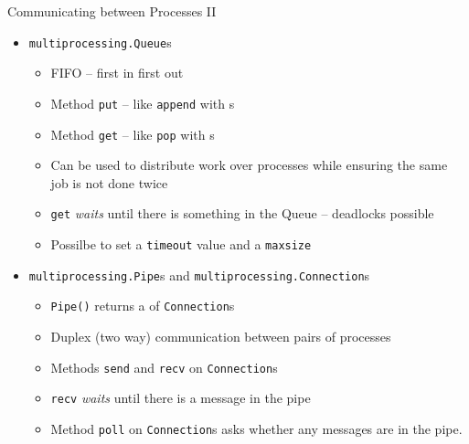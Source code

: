 \begin{frame}[fragile]{Communicating between Processes II}
%
\begin{itemize}
\item \texttt{multiprocessing.Queue}s
	\begin{itemize}
	\item FIFO -- first in first out
	\item Method \texttt{put} -- like \texttt{append} with s
	\item Method \texttt{get} -- like \texttt{pop} with s
	\item Can be used to distribute work over processes while ensuring the same job is not done twice
	\item \texttt{get} \emph{waits} until there is something in the Queue -- deadlocks possible
	\item Possilbe to set a \texttt{timeout} value and a \texttt{maxsize}
	\end{itemize}
\item \texttt{multiprocessing.Pipe}s and \texttt{multiprocessing.Connection}s
	\begin{itemize}
	\item \texttt{Pipe()} returns a  of \texttt{Connection}s
	\item Duplex (two way) communication between pairs of processes
	\item Methods \texttt{send} and \texttt{recv} on \texttt{Connection}s
	\item \texttt{recv} \emph{waits} until there is a message in the pipe
	\item Method \texttt{poll} on \texttt{Connection}s asks whether any messages are in the pipe.
	\end{itemize}
\end{itemize}
%
\end{frame}


